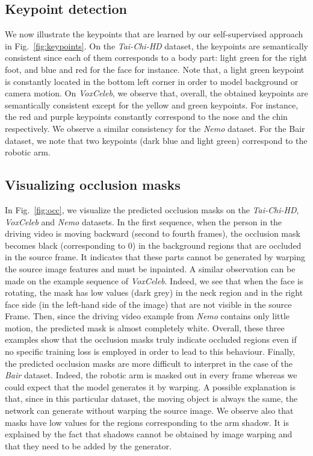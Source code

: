 \documentclass{article}
\begin{document}
\subsection{Keypoint detection}
 We now illustrate the keypoints that are learned by our self-supervised approach in Fig.~\ref{fig:keypoints}.
On the \emph{Tai-Chi-HD} dataset, the keypoints are semantically consistent since each of them corresponds to a body part: light green for the right foot, and blue and red for the face for instance. Note that, a light green keypoint is constantly located in the bottom left corner in order to model background or camera motion.
On \emph{VoxCeleb}, we observe that, overall, the obtained keypoints are semantically consistent except for the yellow and green keypoints. For instance, the red and purple keypoints constantly correspond to the nose and the chin respectively. We observe a similar consistency for the \emph{Nemo} dataset. For the Bair dataset, we note that two keypoints (dark blue and light green) correspond to the robotic arm.


\subsection{Visualizing occlusion masks}
In Fig.~\ref{fig:occ}, we visualize the predicted occlusion masks  on the \emph{Tai-Chi-HD},
\emph{VoxCeleb} and \emph{Nemo} datasets. In the first sequence, when the person in the driving video is moving backward (second to fourth frames), the occlusion mask becomes black (corresponding to 0) in the background regions that are occluded in the source frame. It indicates that these parts cannot be generated by warping the source image features and must be inpainted. 
A similar observation can be made on the example sequence of \emph{VoxCeleb}. Indeed, we see that when the face is rotating, the mask has low values (dark grey) in the neck region and in the right face side (in the left-hand side of the image) that are not visible in the source Frame. Then, since the driving video example from \emph{Nemo} contains only little motion, the predicted mask is almost completely white. 
Overall, these three examples show that the occlusion masks truly indicate occluded regions even if no specific training loss is employed in order to lead to this behaviour. 
Finally,  the predicted occlusion masks are more difficult to interpret in the case of the \emph{Bair} dataset. Indeed, the robotic arm is masked out in every frame whereas we could expect that the model generates it by warping. A possible explanation is that, since in this particular dataset, the moving object is always the same, the network can generate without warping the source image. We observe also that masks have low values for the regions corresponding to the arm shadow. It is explained by the fact that shadows cannot be obtained by image warping and that they need to be added by the generator. 
 
\end{document}

